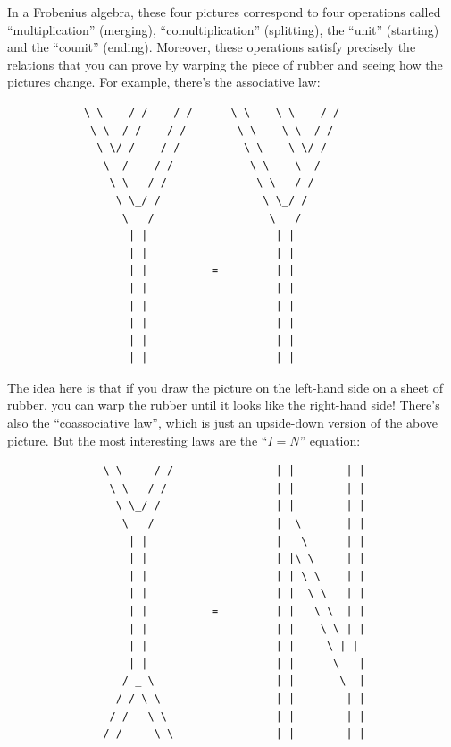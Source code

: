 \documentclass{article}
\begin{document}
In a Frobenius algebra, these four pictures correspond to four
operations called ``multiplication'' (merging), ``comultiplication''
(splitting), the ``unit'' (starting) and the ``counit'' (ending).
Moreover, these operations satisfy precisely the relations that you can
prove by warping the piece of rubber and seeing how the pictures change.
For example, there's the associative law:

\begin{verbatim}
            \ \    / /    / /      \ \    \ \    / /
             \ \  / /    / /        \ \    \ \  / /
              \ \/ /    / /          \ \    \ \/ /
               \  /    / /            \ \    \  /
                \ \   / /              \ \   / /
                 \ \_/ /                \ \_/ /
                  \   /                  \   /
                   | |                    | |
                   | |                    | |    
                   | |          =         | |
                   | |                    | |
                   | |                    | |
                   | |                    | |
                   | |                    | |
                   | |                    | |
\end{verbatim}

The idea here is that if you draw the picture on the left-hand side on a
sheet of rubber, you can warp the rubber until it looks like the
right-hand side! There's also the ``coassociative law'', which is just
an upside-down version of the above picture. But the most interesting
laws are the ``\(I = N\)'' equation:

\begin{verbatim}
               \ \     / /                | |        | |
                \ \   / /                 | |        | |
                 \ \_/ /                  | |        | |
                  \   /                   |  \       | |
                   | |                    |   \      | |
                   | |                    | |\ \     | |   
                   | |                    | | \ \    | |
                   | |                    | |  \ \   | |
                   | |          =         | |   \ \  | |
                   | |                    | |    \ \ | |
                   | |                    | |     \ | |
                   | |                    | |      \   |
                  / _ \                   | |       \  |
                 / / \ \                  | |        | |
                / /   \ \                 | |        | | 
               / /     \ \                | |        | |
\end{verbatim}
\end{document}
